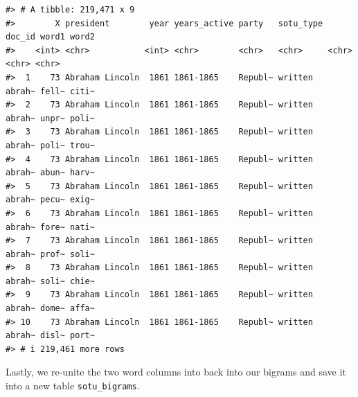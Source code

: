 \documentclass[
]{book}
\newenvironment{Shaded}{\begin{snugshade}}{\end{snugshade}}
\newcommand{\AttributeTok}[1]{\textcolor[rgb]{0.13,0.29,0.53}{#1}}
\newcommand{\CommentTok}[1]{\textcolor[rgb]{0.56,0.35,0.01}{\textit{#1}}}
\newcommand{\ConstantTok}[1]{\textcolor[rgb]{0.56,0.35,0.01}{#1}}
\newcommand{\DecValTok}[1]{\textcolor[rgb]{0.00,0.00,0.81}{#1}}
\newcommand{\FunctionTok}[1]{\textcolor[rgb]{0.13,0.29,0.53}{\textbf{#1}}}
\newcommand{\NormalTok}[1]{#1}
\newcommand{\OtherTok}[1]{\textcolor[rgb]{0.56,0.35,0.01}{#1}}
\newcommand{\SpecialCharTok}[1]{\textcolor[rgb]{0.81,0.36,0.00}{\textbf{#1}}}
\newcommand{\StringTok}[1]{\textcolor[rgb]{0.31,0.60,0.02}{#1}}
\begin{document}
\begin{verbatim}
#> # A tibble: 219,471 x 9
#>        X president        year years_active party   sotu_type doc_id word1 word2
#>    <int> <chr>           <int> <chr>        <chr>   <chr>     <chr>  <chr> <chr>
#>  1    73 Abraham Lincoln  1861 1861-1865    Republ~ written   abrah~ fell~ citi~
#>  2    73 Abraham Lincoln  1861 1861-1865    Republ~ written   abrah~ unpr~ poli~
#>  3    73 Abraham Lincoln  1861 1861-1865    Republ~ written   abrah~ poli~ trou~
#>  4    73 Abraham Lincoln  1861 1861-1865    Republ~ written   abrah~ abun~ harv~
#>  5    73 Abraham Lincoln  1861 1861-1865    Republ~ written   abrah~ pecu~ exig~
#>  6    73 Abraham Lincoln  1861 1861-1865    Republ~ written   abrah~ fore~ nati~
#>  7    73 Abraham Lincoln  1861 1861-1865    Republ~ written   abrah~ prof~ soli~
#>  8    73 Abraham Lincoln  1861 1861-1865    Republ~ written   abrah~ soli~ chie~
#>  9    73 Abraham Lincoln  1861 1861-1865    Republ~ written   abrah~ dome~ affa~
#> 10    73 Abraham Lincoln  1861 1861-1865    Republ~ written   abrah~ disl~ port~
#> # i 219,461 more rows
\end{verbatim}

Lastly, we re-unite the two word columns into back into our bigrams and save it into a new table \texttt{sotu\_bigrams}.

\begin{Shaded}
\end{Shaded}
\end{document}
